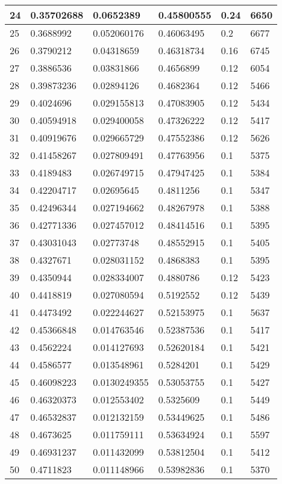 \begin{longtable}{|l|l|l|l|l|l|}
24 & 0.35702688 & 0.0652389 & 0.45800555 & 0.24 & 6650 \\ \hline 
25 & 0.3688992 & 0.052060176 & 0.46063495 & 0.2 & 6677 \\ \hline 
26 & 0.3790212 & 0.04318659 & 0.46318734 & 0.16 & 6745 \\ \hline 
27 & 0.3886536 & 0.03831866 & 0.4656899 & 0.12 & 6054 \\ \hline 
28 & 0.39873236 & 0.02894126 & 0.4682364 & 0.12 & 5466 \\ \hline 
29 & 0.4024696 & 0.029155813 & 0.47083905 & 0.12 & 5434 \\ \hline 
30 & 0.40594918 & 0.029400058 & 0.47326222 & 0.12 & 5417 \\ \hline 
31 & 0.40919676 & 0.029665729 & 0.47552386 & 0.12 & 5626 \\ \hline 
32 & 0.41458267 & 0.027809491 & 0.47763956 & 0.1 & 5375 \\ \hline 
33 & 0.4189483 & 0.026749715 & 0.47947425 & 0.1 & 5384 \\ \hline 
34 & 0.42204717 & 0.02695645 & 0.4811256 & 0.1 & 5347 \\ \hline 
35 & 0.42496344 & 0.027194662 & 0.48267978 & 0.1 & 5388 \\ \hline 
36 & 0.42771336 & 0.027457012 & 0.48414516 & 0.1 & 5395 \\ \hline 
37 & 0.43031043 & 0.02773748 & 0.48552915 & 0.1 & 5405 \\ \hline 
38 & 0.4327671 & 0.028031152 & 0.4868383 & 0.1 & 5395 \\ \hline 
39 & 0.4350944 & 0.028334007 & 0.4880786 & 0.12 & 5423 \\ \hline 
40 & 0.4418819 & 0.027080594 & 0.5192552 & 0.12 & 5439 \\ \hline 
41 & 0.4473492 & 0.022244627 & 0.52153975 & 0.1 & 5637 \\ \hline 
42 & 0.45366848 & 0.014763546 & 0.52387536 & 0.1 & 5417 \\ \hline 
43 & 0.4562224 & 0.014127693 & 0.52620184 & 0.1 & 5421 \\ \hline 
44 & 0.4586577 & 0.013548961 & 0.5284201 & 0.1 & 5429 \\ \hline 
45 & 0.46098223 & 0.0130249355 & 0.53053755 & 0.1 & 5427 \\ \hline 
46 & 0.46320373 & 0.012553402 & 0.5325609 & 0.1 & 5449 \\ \hline 
47 & 0.46532837 & 0.012132159 & 0.53449625 & 0.1 & 5486 \\ \hline 
48 & 0.4673625 & 0.011759111 & 0.53634924 & 0.1 & 5597 \\ \hline 
49 & 0.46931237 & 0.011432099 & 0.53812504 & 0.1 & 5412 \\ \hline 
50 & 0.4711823 & 0.011148966 & 0.53982836 & 0.1 & 5370 \\ \hline 
\end{longtable}